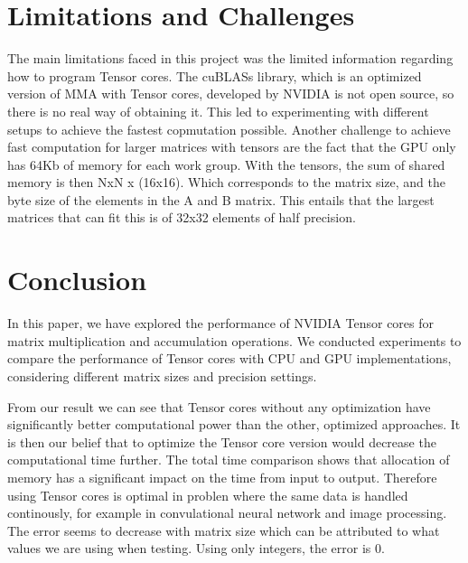\documentclass[conference]{IEEEtran}
\begin{document}
  
  \section{Limitations and Challenges}\label{sec:limitations-challenges}
  The main limitations faced in this project was the limited information regarding how to program Tensor cores.
  The cuBLASs library, which is an optimized version of MMA with Tensor cores, developed by NVIDIA is not open source,
  so there is no real way of obtaining it. This led to experimenting with different setups to achieve the fastest copmutation possible.
  Another challenge to achieve fast computation for larger matrices with tensors are the fact that the GPU 
  only has 64Kb of memory for each work group. With the tensors, the sum of shared memory is then NxN x (16x16).
  Which corresponds to the matrix size, and the byte size of the elements in the A and B matrix. This entails that the 
  largest matrices that can fit this is of 32x32 elements of half precision.


  \section{Conclusion}\label{sec:conclusion}
  
  In this paper, we have explored the performance of NVIDIA Tensor cores for matrix multiplication and accumulation operations. 
  We conducted experiments to compare the performance of Tensor cores with CPU and GPU implementations, 
  considering different matrix sizes and precision settings.

  From our result we can see that Tensor cores without any optimization have significantly better computational power
  than the other, optimized approaches. It is then our belief that to optimize the Tensor core version would 
  decrease the computational time further. The total time comparison shows that allocation of memory has a significant
  impact on the time from input to output. Therefore using Tensor cores is optimal in problen where the same data is
  handled continously, for example in convulational neural network and image processing. The error seems to decrease
  with matrix size which can be attributed to what values we are using when testing. Using only integers, the error is 0.

  



\end{document}
